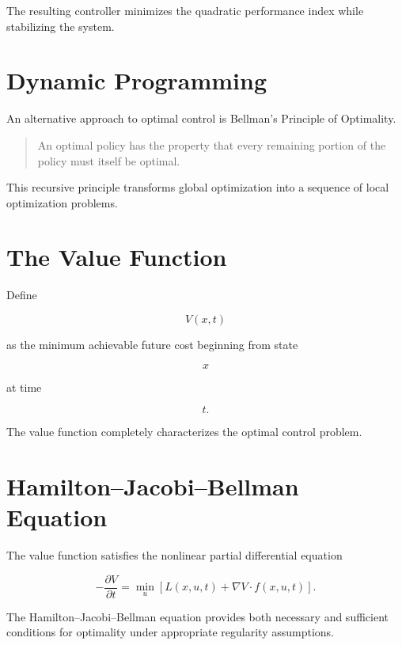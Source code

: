 \documentclass[11pt,fleqn]{book}
\numberwithin{equation}{chapter}
\theoremstyle{plain}
\theoremstyle{definition}
\theoremstyle{remark}
\begin{document}
The resulting controller minimizes the quadratic performance index while
stabilizing the system.


\section{Dynamic Programming}

An alternative approach to optimal control is Bellman's Principle of
Optimality.

\begin{quote}
An optimal policy has the property that every remaining portion of the
policy must itself be optimal.
\end{quote}

This recursive principle transforms global optimization into a sequence
of local optimization problems.


\section{The Value Function}

Define

\[
V(x,t)
\]

as the minimum achievable future cost beginning from state

\[
x
\]

at time

\[
t.
\]

The value function completely characterizes the optimal control problem.


\section{Hamilton--Jacobi--Bellman Equation}

The value function satisfies the nonlinear partial differential equation

\[
\boxed{
-\frac{\partial V}{\partial t}
=
\min_u
\left[
L(x,u,t)
+
\nabla V\cdot f(x,u,t)
\right].
}
\]

The Hamilton--Jacobi--Bellman equation provides both necessary and
sufficient conditions for optimality under appropriate regularity
assumptions.

\end{document}
